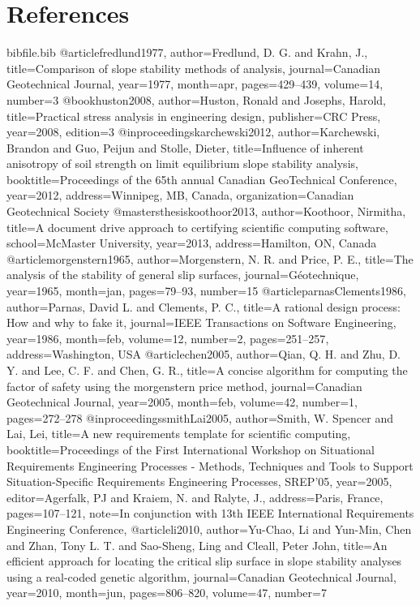\documentclass[12pt]{article}
\begin{document}
\section{References}
\label{Sec:References}
\begin{filecontents*}{bibfile.bib}
@article{fredlund1977,
author={Fredlund, D. G. and Krahn, J.},
title={Comparison of slope stability methods of analysis},
journal={Canadian Geotechnical Journal},
year={1977},
month=apr,
pages={429--439},
volume={14},
number={3}}
@book{huston2008,
author={Huston, Ronald and Josephs, Harold},
title={Practical stress analysis in engineering design},
publisher={CRC Press},
year={2008},
edition={3}}
@inproceedings{karchewski2012,
author={Karchewski, Brandon and Guo, Peijun and Stolle, Dieter},
title={Influence of inherent anisotropy of soil strength on limit equilibrium slope stability analysis},
booktitle={Proceedings of the 65th annual Canadian GeoTechnical Conference},
year={2012},
address={Winnipeg, MB, Canada},
organization={Canadian Geotechnical Society}}
@mastersthesis{koothoor2013,
author={Koothoor, Nirmitha},
title={A document drive approach to certifying scientific computing software},
school={McMaster University},
year={2013},
address={Hamilton, ON, Canada}}
@article{morgenstern1965,
author={Morgenstern, N. R. and Price, P. E.},
title={The analysis of the stability of general slip surfaces},
journal={Géotechnique},
year={1965},
month=jan,
pages={79--93},
number={15}}
@article{parnasClements1986,
author={Parnas, David L. and Clements, P. C.},
title={A rational design process: How and why to fake it},
journal={IEEE Transactions on Software Engineering},
year={1986},
month=feb,
volume={12},
number={2},
pages={251--257},
address={Washington, USA}}
@article{chen2005,
author={Qian, Q. H. and Zhu, D. Y. and Lee, C. F. and Chen, G. R.},
title={A concise algorithm for computing the factor of safety using the morgenstern price method},
journal={Canadian Geotechnical Journal},
year={2005},
month=feb,
volume={42},
number={1},
pages={272--278}}
@inproceedings{smithLai2005,
author={Smith, W. Spencer and Lai, Lei},
title={A new requirements template for scientific computing},
booktitle={Proceedings of the First International Workshop on Situational Requirements Engineering Processes - Methods, Techniques and Tools to Support Situation-Specific Requirements Engineering Processes, SREP'05},
year={2005},
editor={Agerfalk, PJ and Kraiem, N. and Ralyte, J.},
address={Paris, France},
pages={107--121},
note={In conjunction with 13th IEEE International Requirements Engineering Conference,}}
@article{li2010,
author={Yu-Chao, Li and Yun-Min, Chen and Zhan, Tony L. T. and Sao-Sheng, Ling and Cleall, Peter John},
title={An efficient approach for locating the critical slip surface in slope stability analyses using a real-coded genetic algorithm},
journal={Canadian Geotechnical Journal},
year={2010},
month=jun,
pages={806--820},
volume={47},
number={7}}
\end{filecontents*}
\nocite{*}
\printbibliography[heading=none]
\end{document}
